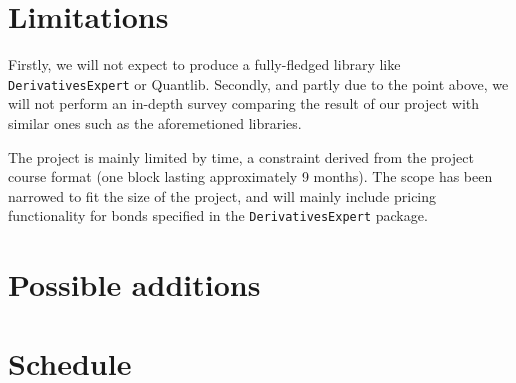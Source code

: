 \documentclass[11pt]{article}
\begin{document}
\section*{Limitations}

Firstly, we will not expect to produce a fully-fledged library like {\tt DerivativesExpert} or Quantlib\cite{Ame2003}.
Secondly, and partly due to the point above, we will not perform an in-depth survey
comparing the result of our project with similar ones such as the aforemetioned libraries.


The project is mainly limited by time, a constraint derived from the project course 
format (one block lasting approximately 9 months).
The scope has been narrowed to fit the size of the project, and will mainly include
pricing functionality for bonds specified in the {\tt DerivativesExpert} package.

\section*{Possible additions}

\section*{Schedule}



\end{document}
